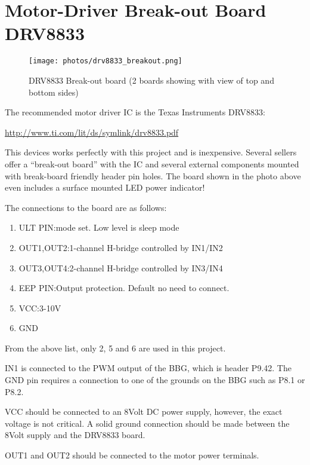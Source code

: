 \chapter{Motor-Driver Break-out Board DRV8833}

\begin{figure}[h]
	\centering
    \texttt{[image: photos/drv8833\_breakout.png]}
	\centering\bfseries
	\caption{DRV8833 Break-out board (2 boards showing with view of top and bottom sides)}
\end{figure}


The recommended motor driver IC is the Texas Instruments DRV8833:

\url{http://www.ti.com/lit/ds/symlink/drv8833.pdf}

This devices works perfectly with this project and is inexpensive.
Several sellers offer a ``break-out board'' with the IC and several external components mounted with break-board friendly header pin holes.  The board shown in the photo above even includes a surface mounted LED power indicator!

The connections to the board are as follows:

\begin{enumerate}
\item ULT PIN:mode set. Low level is sleep mode
\item OUT1,OUT2:1-channel H-bridge controlled by IN1/IN2
\item OUT3,OUT4:2-channel H-bridge controlled by IN3/IN4
\item EEP PIN:Output protection. Default no need to connect.
\item VCC:3-10V
\item GND
\end{enumerate}

From the above list, only 2, 5 and 6 are used in this project.

IN1 is connected to the PWM output of the BBG, which is header P9.42.
The GND pin requires a connection to one of the grounds on the BBG such as P8.1 or P8.2.

VCC should be connected to an 8Volt DC power supply, however, the exact voltage is not critical.  A solid ground connection should be made between the 8Volt supply and the DRV8833 board.

OUT1 and OUT2 should be connected to the motor power terminals.

